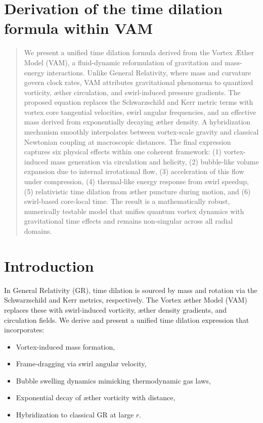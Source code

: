 
\section{Derivation of the time dilation formula within VAM}\label{sec:appendix:1}

\begin{abstract}
We present a unified time dilation formula derived from the Vortex \AE{}ther Model (VAM), a fluid-dynamic reformulation of gravitation and mass-energy interactions. Unlike General Relativity, where mass and curvature govern clock rates, VAM attributes gravitational phenomena to quantized vorticity, æther circulation, and swirl-induced pressure gradients. The proposed equation replaces the Schwarzschild and Kerr metric terms with vortex core tangential velocities, swirl angular frequencies, and an effective mass derived from exponentially decaying æther density. A hybridization mechanism smoothly interpolates between vortex-scale gravity and classical Newtonian coupling at macroscopic distances. The final expression captures six physical effects within one coherent framework: (1) vortex-induced mass generation via circulation and helicity, (2) bubble-like volume expansion due to internal irrotational flow, (3) acceleration of this flow under compression, (4) thermal-like energy response from swirl speedup, (5) relativistic time dilation from æther puncture during motion, and (6) swirl-based core-local time. The result is a mathematically robust, numerically testable model that unifies quantum vortex dynamics with gravitational time effects and remains non-singular across all radial domains.
\end{abstract}

\section*{Introduction}
In General Relativity (GR), time dilation is sourced by mass and rotation via the Schwarzschild and Kerr metrics, respectively. The Vortex \ae{}ther Model (VAM) replaces these with swirl-induced vorticity, æther density gradients, and circulation fields. We derive and present a unified time dilation expression that incorporates:

\begin{itemize}
    \item Vortex-induced mass formation,
    \item Frame-dragging via swirl angular velocity,
    \item Bubble swelling dynamics mimicking thermodynamic gas laws,
    \item Exponential decay of æther vorticity with distance,
    \item Hybridization to classical GR at large $r$.
\end{itemize}

